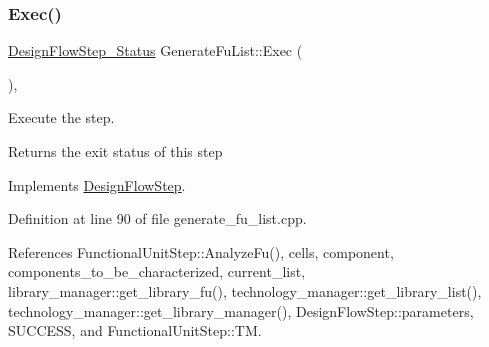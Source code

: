 \subsubsection{\texorpdfstring{Exec()}{Exec()}}
{\footnotesize\ttfamily \hyperlink{design__flow__step_8hpp_afb1f0d73069c26076b8d31dbc8ebecdf}{Design\+Flow\+Step\+\_\+\+Status} Generate\+Fu\+List\+::\+Exec (\begin{DoxyParamCaption}{ }\end{DoxyParamCaption})\hspace{0.3cm}{\ttfamily [override]}, {\ttfamily [virtual]}}



Execute the step. 

\begin{DoxyReturn}{Returns}
the exit status of this step 
\end{DoxyReturn}


Implements \hyperlink{classDesignFlowStep_a77d7e38493016766098711ea24f60b89}{Design\+Flow\+Step}.



Definition at line 90 of file generate\+\_\+fu\+\_\+list.\+cpp.



References Functional\+Unit\+Step\+::\+Analyze\+Fu(), cells, component, components\+\_\+to\+\_\+be\+\_\+characterized, current\+\_\+list, library\+\_\+manager\+::get\+\_\+library\+\_\+fu(), technology\+\_\+manager\+::get\+\_\+library\+\_\+list(), technology\+\_\+manager\+::get\+\_\+library\+\_\+manager(), Design\+Flow\+Step\+::parameters, S\+U\+C\+C\+E\+SS, and Functional\+Unit\+Step\+::\+TM.


